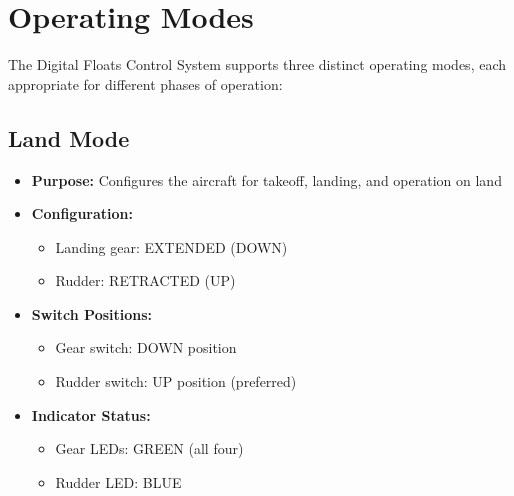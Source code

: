 \documentclass[12pt,a4paper,twoside,openright]{book}
\begin{document}
\section{Operating Modes}

The Digital Floats Control System supports three distinct operating modes, each appropriate for different phases of operation:

\subsection{Land Mode}
\begin{itemize}
    \item \textbf{Purpose:} Configures the aircraft for takeoff, landing, and operation on land
    \item \textbf{Configuration:}
    \begin{itemize}
        \item Landing gear: EXTENDED (DOWN)
        \item Rudder: RETRACTED (UP)
    \end{itemize}
    \item \textbf{Switch Positions:}
    \begin{itemize}
        \item Gear switch: DOWN position
        \item Rudder switch: UP position (preferred)
    \end{itemize}
    \item \textbf{Indicator Status:}
    \begin{itemize}
        \item Gear LEDs: GREEN (all four)
        \item Rudder LED: BLUE
    \end{itemize}
\end{itemize}
\end{document}
